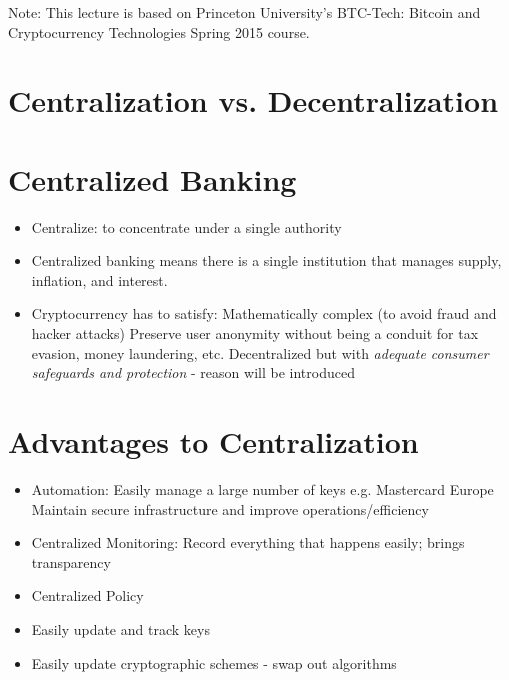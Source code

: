 \documentclass{article}
\begin{document}
\maketitle

Note: This lecture is based on Princeton University's BTC-Tech: Bitcoin and Cryptocurrency Technologies Spring 2015 course.


\section*{Centralization vs. Decentralization}
\section*{Centralized Banking}
\begin{itemize}
  \item Centralize: to concentrate under a single authority
  \item Centralized banking means there is a single institution that manages supply, inflation, and interest.
  \item Cryptocurrency has to satisfy:
    \subitem Mathematically complex (to avoid fraud and hacker attacks)
    \subitem Preserve user anonymity without being a conduit for tax evasion, money laundering, etc.
    \subitem Decentralized but with \emph{adequate consumer safeguards and protection} - reason will be introduced
\end{itemize}

\section*{Advantages to Centralization}
\begin{itemize}
  \item Automation:
    \subitem Easily manage a large number of keys e.g. Mastercard Europe
    \subitem Maintain secure infrastructure and improve operations/efficiency
  \item Centralized Monitoring:
    \subitem Record everything that happens easily; brings transparency
  \item Centralized Policy
  \item Easily update and track keys
  \item Easily update cryptographic schemes - swap out algorithms
\end{itemize}
\end{document}
